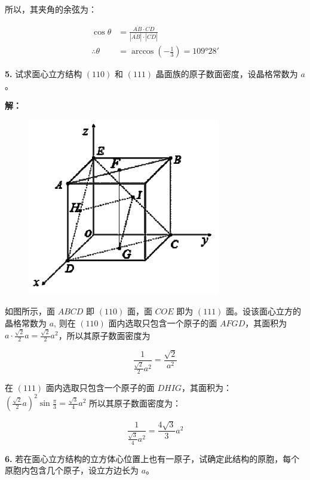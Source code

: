 所以，其夹角的余弦为：

\begin{align*}
    \cos\theta &= \frac{\overline{AB} \cdot \overline{CD}}{|\overline{AB}| \cdot |\overline{CD}|} \\
    \therefore \theta &= \arccos\left(-\frac{1}{3}\right) = \ang{109;28}
\end{align*}

\noindent \textbf{5.\quad} 试求面心立方结构 $(110)$ 和 $(111)$ 晶面族的原子数面密度，设晶格常数为 $a$。

\noindent \textbf{解：}

\begin{figure}[htbp]
    \centering
    \includegraphics{pic/坐标系2.png}
    \caption{}
    \label{fig:1.3}
\end{figure}

如图所示，面 $ABCD$ 即 $(110)$ 面，面 $COE$ 即为 $(111)$ 面。设该面心立方的晶格常数为 $a$, 则在 $(110)$ 面内选取只包含一个原子的面 $AFGD$，其面积为 $a \cdot \frac{\sqrt{2}}{2} a=\frac{\sqrt{2}}{2} a^2$，所以其原子数面密度为

\begin{equation*}
    \frac{1}{\frac{\sqrt{2}}{2} a^2} = \frac{\sqrt{2}}{a^2}
\end{equation*}

在 $(111)$ 面内选取只包含一个原子的面 $DHIG$，其面积为：$\left(\frac{\sqrt{2}}{2}a\right)^2 \sin \frac{\pi}{3}=\frac{\sqrt{3}}{4} a^2$ 所以其原子数面密度为：

\begin{equation*}
    \frac{1}{\frac{\sqrt{3}}{4} a^2} = \frac{4\sqrt{3}}{3} a^2
\end{equation*}

\noindent \textbf{6.\quad} 若在面心立方结构的立方体心位置上也有一原子，试确定此结构的原胞，每个原胞内包含几个原子，设立方边长为 $a$。


